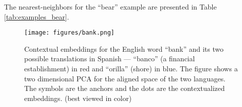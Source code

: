 \documentclass[11pt,a4paper]{article}
\newcommand{\tabref}[1]{Table \ref{#1}}
\begin{document}
The nearest-neighbors for the ``bear'' example are presented in \tabref{tab:examples_bear}.


\newcommand{\specialcell}[2][c]{\begin{tabular}[#1]{@{}l@{}}#2\end{tabular}}

\begin{figure}[t!]
    \centering
  \texttt{[image: figures/bank.png]}

    \caption{Contextual embeddings for the English word ``bank'' and its two possible translations in Spanish ---  ``banco'' (a financial establishment) in red and  ``orilla'' (shore) in blue. The figure shows a two dimensional PCA for the aligned space of the two languages. The symbols are the anchors and the dots are the contextualized embeddings. (best viewed in color) } \label{fig:bank}
\end{figure}
\end{document}
